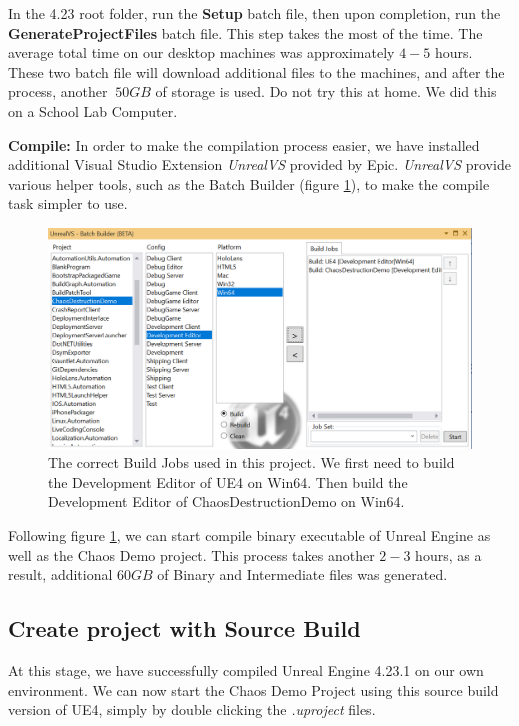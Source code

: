 \documentclass[sigconf]{acmart}
\begin{document}
In the 4.23 root folder, run the \textbf{Setup} batch file, then upon completion, run the \textbf{GenerateProjectFiles} batch file. This step takes the most of the time. The average total time on our desktop machines was approximately $4-5$ hours. These two batch file will download additional files to the machines, and after the process, another $~50 GB$ of storage is used. Do not try this at home. We did this on a School Lab Computer. 

\vspace{5mm}

\textbf{Compile:} In order to make the compilation process easier, we have installed additional Visual Studio Extension \textit{UnrealVS} provided by Epic. \textit{UnrealVS} provide various helper tools, such as the Batch Builder (figure \ref{fig:unrealvs}), to make the compile task simpler to use. 

\begin{figure}[ht]
  \centering
  \includegraphics[width=\linewidth]{aaafiles/unrealvs.png}
  \caption{The correct Build Jobs used in this project. We first need to build the Development Editor of UE4 on Win64. Then build the Development Editor of ChaosDestructionDemo on Win64.}
  \label{fig:unrealvs}
\end{figure}

Following figure \ref{fig:unrealvs}, we can start compile binary executable of Unreal Engine as well as the Chaos Demo project. This process takes another $2-3$ hours, as a result, additional $60 GB$ of Binary and Intermediate files was generated. 

\subsection{Create project with Source Build}

At this stage, we have successfully compiled Unreal Engine 4.23.1 on our own environment. We can now start the Chaos Demo Project using this source build version of UE4, simply by double clicking the \textit{.uproject} files. 
\end{document}
